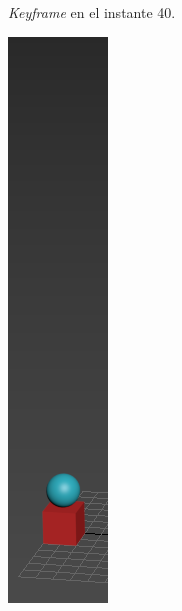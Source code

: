 \documentclass{article}
\begin{document}
\begin{figure}[H]
\begin{subfigure}[H]{0.15\textwidth}
	    \caption{\textit{Keyframe} en el instante 40.}
	\end{subfigure}
    \hfill
	\begin{subfigure}[H]{0.15\textwidth}
	    \centering
	    \includegraphics[width=\textwidth]{imagenes/p1_ins15.png}

\end{subfigure}
\end{figure}
\end{document}
